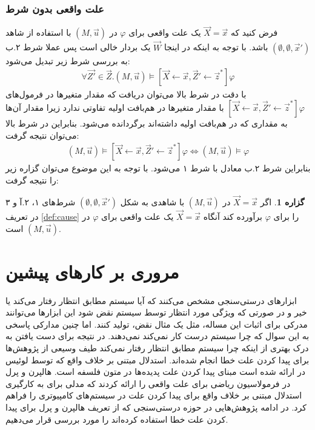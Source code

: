 \documentclass[
msc,
irfonts
]{./tex/tehran-thesis}
\newcommand{\پ}{پروژه/پایان‌نامه/رساله }
\theoremstyle{definition}
\theoremstyle{theorem}
\newtheorem{proposition}[definition]{گزاره}
\theoremstyle{definition}
\numberwithin{algorithm}{chapter}
\newcommand{\e}{\emptyset}
\newcommand{\la}{\leftarrow}
\begin{document}
\subsection{علت واقعی بدون شرط}
فرض کنید که
$\vec X = \vec x$
یک علت واقعی برای
$\varphi$
در
$(M,\vec u)$
با استفاده از شاهد
$(\e,\e,\vec x')$
باشد.
با توجه به اینکه در اینجا
$\vec W$
یک بردار خالی است پس عملا شرط ۲.ب به بررسی شرط زیر تبدیل می‌شود:
\begin{align*}
      \forall \vec{Z'}\in \vec{Z}.
      (M,\vec{u})\vDash [\vec X\la\vec x,\vec{Z}'\la \vec{z}^*]\varphi
\end{align*}
با دقت در شرط بالا می‌توان دریافت که مقدار متغیر‌ها در فرمول‌های
$[\vec X\la\vec x,\vec{Z}'\la \vec{z}^*]\varphi $
با مقدار متغیر‌ها در هم‌بافت اولیه تفاوتی ندارد زیرا مقدار آن‌ها به مقداری که در هم‌بافت اولیه داشته‌اند برگردانده می‌شود.
بنابراین در شرط بالا می‌توان نتیجه گرفت:
\begin{align*}
      (M,\vec{u})\vDash [\vec X\la\vec x,\vec{Z}'\la \vec{z}^*]\varphi 
      \iff (M,\vec{u}) \vDash \varphi
\end{align*}
بنابراین شرط ۲.ب معادل با شرط ۱ می‌شود.
با توجه به این موضوع می‌توان گزاره زیر را نتیجه گرفت:
\begin{proposition}
      \label{prop:but-for}
     اگر 
     $\vec X = \vec x$
     در 
     $(M,\vec u)$
     با شاهدی به شکل
     $(\e,\e,\vec x')$
     شرط‌های ۱، ۲.آ و ۳ در تعریف 
     \ref{def:cause}
     را برای 
     $\varphi$
     برآورده کند آنگاه 
     $\vec X = \vec x$
     یک علت واقعی برای 
     $\varphi$
     در 
     $(M,\vec u)$
     است.
\end{proposition}
 \clearpage{}
\clearpage{}\chapter{مروری بر کار‌های پیشین}
ابزار‌های درستی‌سنجی مشخص می‌کنند که آیا سیستم مطابق انتظار رفتار می‌کند یا خیر و در صورتی که ویژگی مورد انتظار توسط سیستم نقض شود این ابزارها می‌توانند مدرکی برای اثبات این مساله، مثل یک مثال نقض، تولید کنند.
اما چنین مدارکی پاسخی به این سوال که چرا سیستم درست کار نمی‌کند نمی‌دهند. 
در نتیجه برای دست یافتن به درک بهتری از اینکه چرا سیستم مطابق انتظار رفتار نمی‌کند طیف وسیعی از پژوهش‌ها برای  پیدا کردن علت خطا انجام شده‌اند.
استدلال مبتنی بر خلاف واقع که توسط لوئیس در 
\cite{lewis1973counterfactuals}
ارائه شده است مبنای پیدا کردن علت پدیده‌ها در متون فلسفه است.
هالپرن و پرل در 
\cite{hp}
فرمولاسیون ریاضی برای علت واقعی را ارائه کردند که مدلی برای به کارگیری استدلال مبتنی بر خلاف واقع برای پیدا کردن علت در سیستم‌های کامپیوتری را فراهم کرد.
در ادامه پژوهش‌هایی در حوزه درستی‌سنجی که از تعریف هالپرن و پرل برای پیدا کردن علت خطا استفاده کرده‌اند را مورد بررسی قرار می‌دهیم.
\end{document}
